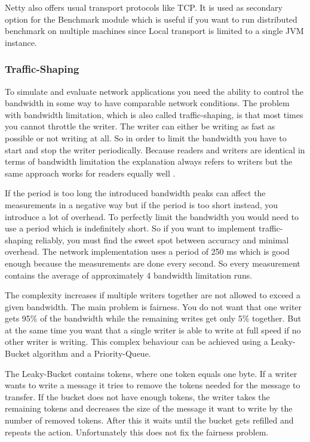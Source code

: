 Netty also offers usual transport protocols like TCP. It is used as secondary option for the Benchmark module which is useful if you want to run distributed benchmark on multiple machines since Local transport is limited to a single JVM instance.


\subsubsection{Traffic-Shaping}
To simulate and evaluate network applications you need the ability to control the bandwidth in some way to have comparable network conditions. The problem with bandwidth limitation, which is also called traffic-shaping, is that most times you cannot throttle the writer. The writer can either be writing as fast as possible or not writing at all. So in order to limit the bandwidth you have to start and stop the writer periodically. Because readers and writers are identical in terms of bandwidth limitation the explanation always refers to writers but the same approach works for readers equally well .

If the period is too long the introduced bandwidth peaks can affect the measurements in a negative way but if the period is too short instead, you introduce a lot of overhead. To perfectly limit the bandwidth you would need to use a period which is indefinitely short. So if you want to implement traffic-shaping reliably, you must find the sweet spot between accuracy and minimal overhead. The network implementation uses a period of 250 ms which is good enough because the measurements are done every second. So every measurement contains the average of approximately 4 bandwidth limitation runs.

The complexity increases if multiple writers together are not allowed to exceed a given bandwidth. The main problem is fairness. You do not want that one writer gets 95\% of the bandwidth while the remaining writes get only 5\% together. But at the same time you want that a single writer is able to write at full speed if no other writer is writing. This complex behaviour can be achieved using a Leaky-Bucket algorithm and a Priority-Queue.

The Leaky-Bucket contains tokens, where one token equals one byte. If a writer wants to write a message it tries to remove the tokens needed for the message to transfer. If the bucket does not have enough tokens, the writer takes the remaining tokens and decreases the size of the message it want to write by the number of removed tokens. After this it waits until the bucket gets refilled and repeats the action. Unfortunately this does not fix the fairness problem.

